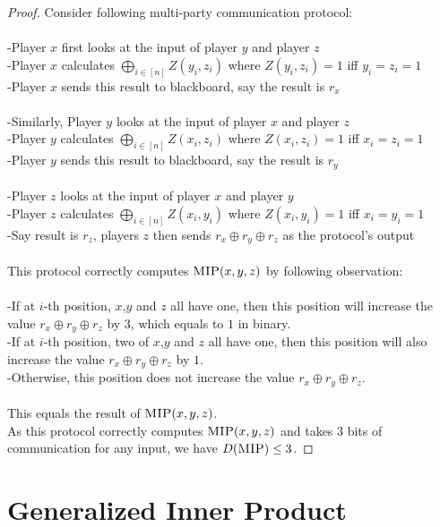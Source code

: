 \begin{proof}
	Consider following multi-party communication protocol:\\
	\\
	-Player $x$ first looks at the input of player $y$ and player $z$\\
	-Player $x$ calculates $\bigoplus_{i \in [n]} Z(y_i,z_i)$ where $Z(y_i,z_i) = 1$ iff $y_i = z_i = 1$\\
	-Player $x$ sends this result to blackboard, say the result is $r_x$ \\
	\\
	-Similarly, Player $y$ looks at the input of player $x$ and player $z$\\
	-Player $y$ calculates $\bigoplus_{i \in [n]} Z(x_i,z_i)$ where $Z(x_i,z_i) = 1$ iff $x_i = z_i = 1$\\
	-Player $y$ sends this result to blackboard, say the result is $r_y$ \\
	\\
	-Player $z$ looks at the input of player $x$ and player $y$\\
	-Player $z$ calculates $\bigoplus_{i \in [n]} Z(x_i,y_i)$ where $Z(x_i,y_i) = 1$ iff $x_i = y_i = 1$\\
	-Say result is $r_z$, players $z$ then sends $r_x \oplus r_y \oplus r_z$ as the protocol's output \\
	\\
	This protocol correctly computes $\textsc{MIP}(x,y,z)$ by following observation:\\
	\\
	-If at $i$-th position, $x$,$y$ and $z$ all have one, then this position will increase the value $r_x \oplus r_y \oplus r_z$ by $3$, which equals to $1$ in binary.\\
	-If at $i$-th position, two of $x$,$y$ and $z$ all have one,  then this position will also increase the value $r_x \oplus r_y \oplus r_z$ by $1$.\\
	-Otherwise, this position does not increase the value $r_x \oplus r_y \oplus r_z$.\\
	\\
	This equals the result of $\textsc{MIP}(x,y,z)$. \\
	As this protocol correctly computes $\textsc{MIP}(x,y,z)$ and takes $3$ bits of communication for any input, we have  $D(\textsc{MIP}) \le 3$. 
\end{proof}



\section{Generalized Inner Product}


